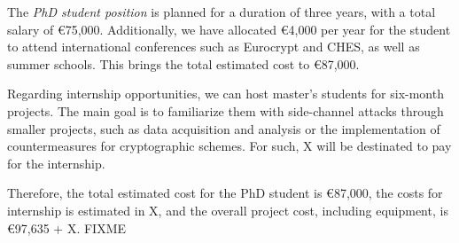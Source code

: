 \documentclass[11pt, a4paper]{article}
\begin{document}
The \emph{PhD student position} is planned for a duration of three years, with a total 
salary of €75,000. Additionally, we have allocated 
€4,000 per year for the student to attend international 
conferences such as Eurocrypt and CHES, as well as summer schools. 
This brings the total estimated cost to €87,000.

Regarding internship opportunities, we can host master's 
students for six-month projects. The main goal is to familiarize them 
with side-channel attacks through smaller projects, such as data 
acquisition and analysis or the implementation of countermeasures for 
cryptographic schemes. For such, X will be destinated 
to pay for the internship.


Therefore, the total estimated cost for the PhD student is €87,000,
the costs for internship is estimated in X, 
and the overall project cost, including equipment, is €97,635 + X. FIXME
\newpage
\end{document}

